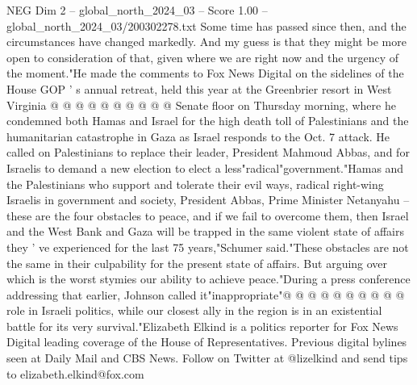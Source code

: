 \begin{textsample}{NEG Dim 2 – global\_north\_2024\_03 – Score 1.00 – global\_north\_2024\_03/200302278.txt}
Some time has passed since then, and the circumstances have changed markedly.
And my guess is that they might be more open to consideration of that, given where we are right now and the urgency of the moment."He made the comments to Fox News Digital on the sidelines of the House GOP ' s annual retreat, held this year at the Greenbrier resort in West Virginia @ @ @ @ @ @ @ @ @ @ Senate floor on Thursday morning, where he condemned both Hamas and Israel for the high death toll of Palestinians and the humanitarian catastrophe in Gaza as Israel responds to the Oct. 7 attack.
He called on Palestinians to replace their leader, President Mahmoud Abbas, and for Israelis to demand a new election to elect a less"radical"government."Hamas and the Palestinians who support and tolerate their evil ways, radical right-wing Israelis in government and society, President Abbas, Prime Minister Netanyahu -- these are the four obstacles to peace, and if we fail to overcome them, then Israel and the West Bank and Gaza will be trapped in the same violent state of affairs they ' ve experienced for the last 75 years,"Schumer said."These obstacles are not the same in their culpability for the present state of affairs.
But arguing over which is the worst stymies our ability to achieve peace."During a press conference addressing that earlier, Johnson called it"inappropriate"@ @ @ @ @ @ @ @ @ @ role in Israeli politics, while our closest ally in the region is in an existential battle for its very survival."Elizabeth Elkind is a politics reporter for Fox News Digital leading coverage of the House of Representatives.
Previous digital bylines seen at Daily Mail and CBS News.
Follow on Twitter at @lizelkind and send tips to elizabeth.elkind@fox.com

\end{textsample}
